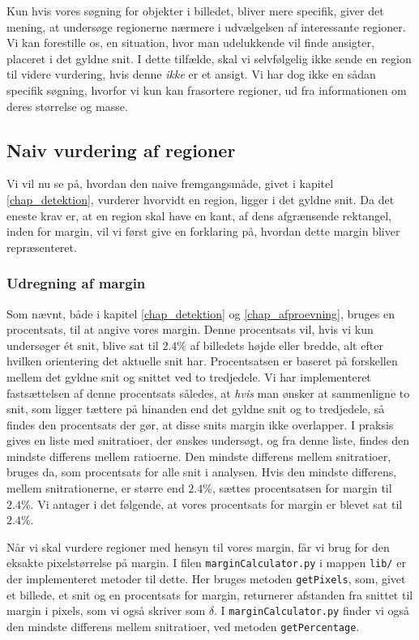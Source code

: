 {Kun hvis vores søgning for objekter i billedet, bliver mere specifik,
giver det mening, at undersøge regionerne nærmere i udvælgelsen af
interessante regioner. Vi kan forestille os, en situation, hvor man
udelukkende vil finde ansigter, placeret i det gyldne snit. I dette
tilfælde, skal vi selvfølgelig ikke sende en region til videre
vurdering, hvis denne \emph{ikke} er et ansigt. Vi har dog ikke en sådan
specifik søgning, hvorfor vi kun kan frasortere regioner, ud fra
informationen om deres størrelse og masse.

\subsection{Naiv vurdering af regioner}
Vi vil nu se på, hvordan den naive fremgangsmåde, givet i kapitel
\ref{chap_detektion}, vurderer hvorvidt en region, ligger i det gyldne
snit. Da det eneste krav er, at en region skal have en kant, af dens
afgrænsende rektangel, inden for margin, vil vi først give en forklaring
på, hvordan dette margin bliver repræsenteret.

\subsubsection{Udregning af margin\label{subsec_margin_udregning}}
Som nævnt, både i kapitel \ref{chap_detektion} og
\ref{chap_afproevning}, bruges en procentsats, til at angive vores
margin. Denne procentsats vil, hvis vi kun undersøger ét snit, blive sat
til $2.4\%$ af billedets højde eller bredde, alt efter hvilken
orientering det aktuelle snit har.  Procentsatsen er baseret på
forskellen mellem det gyldne snit og snittet ved to tredjedele. Vi har
implementeret fastsættelsen af denne procentsats således, at \emph{hvis}
man ønsker at sammenligne to snit, som ligger tættere på hinanden end det
gyldne snit og to tredjedele, så findes den procentsats der gør, at
disse snits margin ikke overlapper. I praksis gives en liste med
snitratioer, der ønskes undersøgt, og fra denne liste, findes den
mindste differens mellem ratioerne. Den mindste differens mellem
snitratioer, bruges da, som procentsats for alle snit i analysen. Hvis
den mindste differens, mellem snitrationerne, er større end $2.4\%$,
sættes procentsatsen for margin til $2.4\%$. Vi antager i det følgende,
at vores procentsats for margin er blevet sat til $2.4\%$.

Når vi skal vurdere regioner med hensyn til vores margin, får vi brug
for den eksakte pixelstørrelse på margin. I filen
\texttt{marginCalculator.py} i mappen \texttt{lib/} er der implementeret
metoder til dette. Her bruges metoden \texttt{getPixels}, som, givet et
billede, et snit og en procentsats for margin, returnerer afstanden fra
snittet til margin i pixels, som vi også skriver som $\delta$. I
\texttt{marginCalculator.py} finder vi også den mindste differens mellem
snitratioer, ved metoden \texttt{getPercentage}.

}
